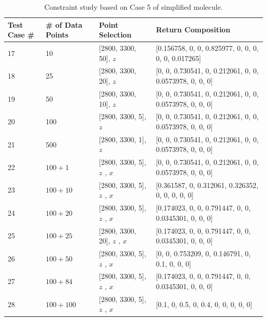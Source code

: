 \begin{table} 
\begin{center} \tiny
{\def\arraystretch{1.5}
\begin{tabular}{| p{1cm} | p{2cm} | p{4cm}  | l |}
\hline
Test Case \# & \# of Data Points & Point Selection & Return Composition \\ \hline
17 & 10 & [2800, 3300, 50], $z$ & [0.156758, 0, 0, 0.825977, 0, 0, 0, 0, 0, 0.017265] \\ \hline
18 & 25 & [2800, 3300, 20], $z$ & [0, 0, 0.730541, 0, 0.212061, 0, 0, 0.0573978, 0, 0, 0] \\ \hline
19 & 50 & [2800, 3300, 10], $z$ & [0, 0, 0.730541, 0, 0.212061, 0, 0, 0.0573978, 0, 0, 0] \\ \hline
20 & 100 & [2800, 3300, 5], $z$ & [0, 0, 0.730541, 0, 0.212061, 0, 0, 0.0573978, 0, 0, 0] \\ \hline
21 & 500 & [2800, 3300, 1], $z$ & [0, 0, 0.730541, 0, 0.212061, 0, 0, 0.0573978, 0, 0, 0] \\ \hline	
22 & $100 + 1$ & [2800, 3300, 5], $z$ \newline [2800, 3300, 500], $x$  & [0, 0, 0.730541, 0, 0.212061, 0, 0, 0.0573978, 0, 0, 0] \\ \hline
23 & $100 + 10$ & [2800, 3300, 5], $z$ \newline [2800, 3300, 50], $x$  & [0.361587, 0, 0.312061, 0.326352, 0, 0, 0, 0, 0] \\ \hline
24 & $100 + 20$ & [2800, 3300, 5], $z$ \newline [2800, 3300, 25], $x$  & [0.174023, 0, 0, 0.791447, 0, 0, 0.0345301, 0, 0, 0] \\ \hline
25 & $100 + 25$ & [2800, 3300, 20], $z$ \newline [2800, 3300, 20], $x$  & [0.174023, 0, 0, 0.791447, 0, 0, 0.0345301, 0, 0, 0] \\ \hline
26 & $100 + 50$ & [2800, 3300, 5], $z$ \newline [2800, 3300, 10], $x$  & [0, 0, 0.753209, 0, 0.146791, 0, 0.1, 0, 0, 0] \\ \hline
27 & $100 + 84$ & [2800, 3300, 5], $z$ \newline [2800, 3300, 6], $x$  & [0.174023, 0, 0, 0.791447, 0, 0, 0.0345301, 0, 0, 0] \\ \hline
28 & $100 + 100$ & [2800, 3300, 5], $z$ \newline [2800, 3300, 5], $x$  & [0.1, 0, 0.5, 0, 0.4, 0, 0, 0, 0, 0] \\ 
\hline
\end{tabular} \\
}
\caption{Constraint study based on Case 5 of simplified molecule.}\label{tab:7.4}
\end{center}
\end{table}